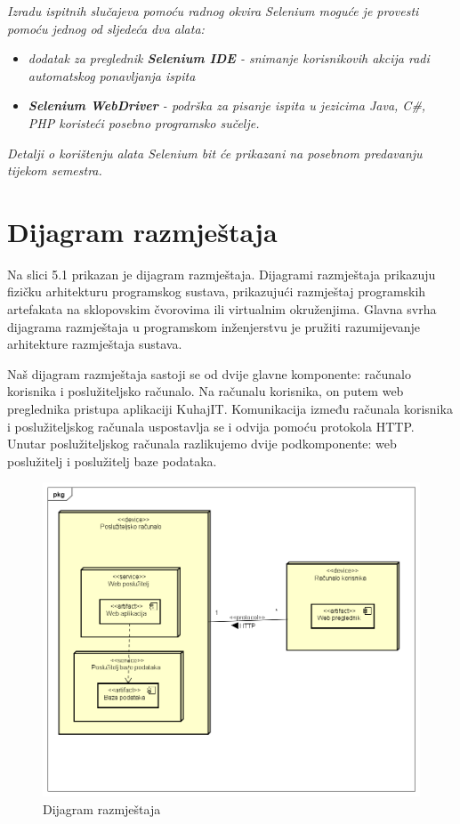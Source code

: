 			 \textit{Izradu ispitnih slučajeva pomoću radnog okvira Selenium moguće je provesti pomoću jednog od sljedeća dva alata:}
			 \begin{itemize}
			 	\item \textit{dodatak za preglednik \textbf{Selenium IDE} - snimanje korisnikovih akcija radi automatskog ponavljanja ispita	}
			 	\item \textit{\textbf{Selenium WebDriver} - podrška za pisanje ispita u jezicima Java, C\#, PHP koristeći posebno programsko sučelje.}
			 \end{itemize}
		 	\textit{Detalji o korištenju alata Selenium bit će prikazani na posebnom predavanju tijekom semestra.}
			
			\eject 
		
		
		\section{Dijagram razmještaja}
			
		
		Na slici 5.1 prikazan je dijagram razmještaja. Dijagrami razmještaja prikazuju fizičku arhitekturu programskog sustava, prikazujući razmještaj programskih artefakata na sklopovskim čvorovima ili virtualnim okruženjima. Glavna svrha dijagrama razmještaja u programskom inženjerstvu je pružiti razumijevanje arhitekture razmještaja sustava.
		
		Naš dijagram razmještaja sastoji se od dvije glavne komponente: računalo korisnika i poslužiteljsko računalo. Na računalu korisnika, on putem web preglednika pristupa aplikaciji KuhajIT. Komunikacija između računala korisnika i poslužiteljskog računala uspostavlja se i odvija pomoću protokola HTTP. Unutar poslužiteljskog računala razlikujemo dvije podkomponente: web poslužitelj i poslužitelj baze podataka.
		
					\begin{figure}[H]
			\includegraphics[scale=0.4]{dijagrami/UML_dijagram_razmjestaja.PNG} %
			\centering
			\caption{Dijagram razmještaja}
			\label{Dijagram razmještaja}
		\end{figure}
		

